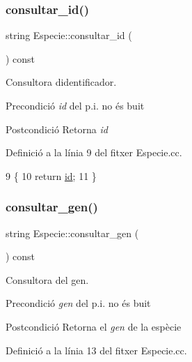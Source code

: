 \subsubsection{\texorpdfstring{consultar\+\_\+id()}{consultar\_id()}}
{\footnotesize\ttfamily string Especie\+::consultar\+\_\+id (\begin{DoxyParamCaption}{ }\end{DoxyParamCaption}) const}



Consultora d\textquotesingle{}identificador. 

\begin{DoxyPrecond}{Precondició}
{\itshape id} del p.\+i. no és buit 
\end{DoxyPrecond}
\begin{DoxyPostcond}{Postcondició}
Retorna {\itshape id} 
\end{DoxyPostcond}


Definició a la línia 9 del fitxer Especie.\+cc.


\begin{DoxyCode}
9                                    \{
10     \textcolor{keywordflow}{return} \hyperlink{class_especie_a91b94109fb8a456bba7199cdda36d588}{id};
11 \}
\end{DoxyCode}
\mbox{\label{class_especie_a850af2b59a21e2d801c59d76ba5c1a98}} 
\subsubsection{\texorpdfstring{consultar\+\_\+gen()}{consultar\_gen()}}
{\footnotesize\ttfamily string Especie\+::consultar\+\_\+gen (\begin{DoxyParamCaption}{ }\end{DoxyParamCaption}) const}



Consultora del gen. 

\begin{DoxyPrecond}{Precondició}
{\itshape gen} del p.\+i. no és buit 
\end{DoxyPrecond}
\begin{DoxyPostcond}{Postcondició}
Retorna el {\itshape gen} de la espècie 
\end{DoxyPostcond}


Definició a la línia 13 del fitxer Especie.\+cc.


